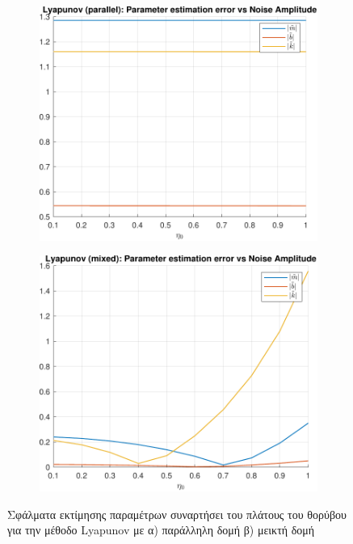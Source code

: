 \documentclass[a4paper,12pt]{article}
\begin{document}
\begin{figure}[h!]
    \centering
    \begin{subfigure}{0.45\textwidth}
        \centering
        \includegraphics[width=\linewidth]{
        plot/task1_estimation_parameter_error_vs_noise_amplitude_lyapunov_parallel.pdf}
        \caption{}
        \label{fig:task1_estimation_parameter_error_vs_noise_amplitude_lyapunov_parallel}
    \end{subfigure}
    \hfill
    \begin{subfigure}{0.45\textwidth}
        \centering
        \includegraphics[width=\linewidth]{
        plot/task1_estimation_parameter_error_vs_noise_amplitude_lyapunov_mixed.pdf}
        \caption{}
        \label{fig:task1_estimation_parameter_error_vs_noise_amplitude_lyapunov_mixed}
    \end{subfigure}
    \caption{Σφάλματα εκτίμησης παραμέτρων συναρτήσει του πλάτους του θορύβου για την μέθοδο
    Lyapunov με 
    α) παράλληλη δομή β) μεικτή δομή}
    \label{fig:task1_estimation_parameter_error_vs_noise_amplitude_lyapunov}
\end{figure}
\end{document}
